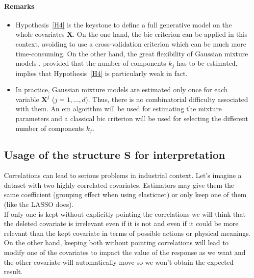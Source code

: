 \documentclass[12pt,a4paper]{report}
\begin{document}
\paragraph{Remarks}\begin{itemize}
	\item Hypothesis~\ref{H4} is the keystone to define a full generative model on the whole covariates $\boldsymbol{X}$. On the one hand, the {\sc bic} criterion can be applied in this context, avoiding to use a cross-validation criterion which can be much more time-consuming. On the other hand, the great flexibility  of Gaussian mixture models \cite{mclachlan2004finite}, provided that the number of components $k_j$ has to be estimated, implies that Hypothesis~\ref{H4} is particularly weak in fact.
\item In practice, Gaussian mixture models are estimated only once for each variable $\boldsymbol{X}^j$ ($j=1,\ldots,d$). Thus, there is no combinatorial difficulty associated with them. An {\sc em} algorithm \cite{dempster1977maximum} will be used for estimating the mixture parameters and a classical {\sc bic} criterion \cite{Sch1978} will be used for selecting the different number of components $k_j$.
\end{itemize}	
	
	
	
	\subsection{Usage of the structure $\boldsymbol{S}$ for interpretation}
		
	
	Correlations can lead to serious problems in industrial context. Let's imagine a dataset with two highly correlated covariates. Estimators may give them the same coefficient (grouping effect when using elasticnet) or only keep one of them (like the LASSO does). \\
	
	If only one is kept without explicitly pointing the correlations we will think that the deleted covariate is irrelevant even if it is not and even if it could be more relevant than the kept covariate in terms of possible actions or physical meanings.\\
	
	 On the other hand, keeping both without pointing correlations will lead to modify one of the covariates to impact the value of the response as we want and the other covariate will automatically move so we won't obtain the expected result.\\
	 
\end{document}
